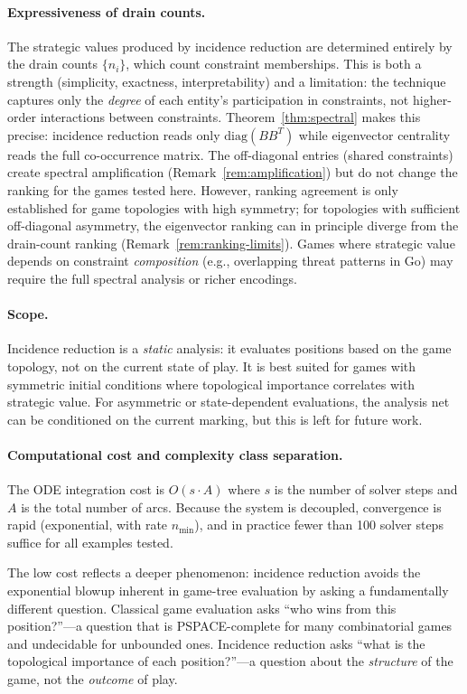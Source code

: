 \documentclass[11pt,a4paper]{article}
\begin{document}
\paragraph{Expressiveness of drain counts.}
The strategic values produced by incidence reduction are determined entirely by the drain counts $\{n_i\}$, which count constraint memberships.
This is both a strength (simplicity, exactness, interpretability) and a limitation: the technique captures only the \emph{degree} of each entity's participation in constraints, not higher-order interactions between constraints.
Theorem~\ref{thm:spectral} makes this precise: incidence reduction reads only $\mathrm{diag}(BB^T)$ while eigenvector centrality reads the full co-occurrence matrix.
The off-diagonal entries (shared constraints) create spectral amplification (Remark~\ref{rem:amplification}) but do not change the ranking for the games tested here.
However, ranking agreement is only established for game topologies with high symmetry; for topologies with sufficient off-diagonal asymmetry, the eigenvector ranking can in principle diverge from the drain-count ranking (Remark~\ref{rem:ranking-limits}).
Games where strategic value depends on constraint \emph{composition} (e.g., overlapping threat patterns in Go) may require the full spectral analysis or richer encodings.

\paragraph{Scope.}
Incidence reduction is a \emph{static} analysis: it evaluates positions based on the game topology, not on the current state of play.
It is best suited for games with symmetric initial conditions where topological importance correlates with strategic value.
For asymmetric or state-dependent evaluations, the analysis net can be conditioned on the current marking, but this is left for future work.

\paragraph{Computational cost and complexity class separation.}
The ODE integration cost is $O(s \cdot A)$ where $s$ is the number of solver steps and $A$ is the total number of arcs.
Because the system is decoupled, convergence is rapid (exponential, with rate $n_{\min}$), and in practice fewer than 100 solver steps suffice for all examples tested.

The low cost reflects a deeper phenomenon: incidence reduction avoids the exponential blowup inherent in game-tree evaluation by asking a fundamentally different question.
Classical game evaluation asks ``who wins from this position?''---a question that is PSPACE-complete for many combinatorial games and undecidable for unbounded ones.
Incidence reduction asks ``what is the topological importance of each position?''---a question about the \emph{structure} of the game, not the \emph{outcome} of play.
\end{document}

